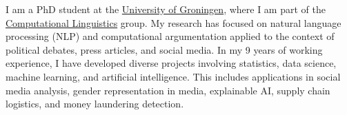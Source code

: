 \documentclass[10pt,a4paper,ragged2e,withhyper]{altacv}
\begin{document}

\makecvheader

\begin{justify}
\vspace{-1em}

I am a PhD student at the \href{https://www.rug.nl/}{University of Groningen}, where I am part of the \href{https://www.rug.nl/research/clcg/research/cl/}{Computational Linguistics} group.  
My research has focused on natural language processing (NLP) and computational argumentation applied to the context of political debates, press articles, and social media.  
In my 9 years of working experience, I have developed diverse projects involving statistics, data science, machine learning, and artificial intelligence.
This includes applications in social media analysis, gender representation in media, explainable AI, supply chain logistics, and money laundering detection.

\end{justify}
\end{document}
